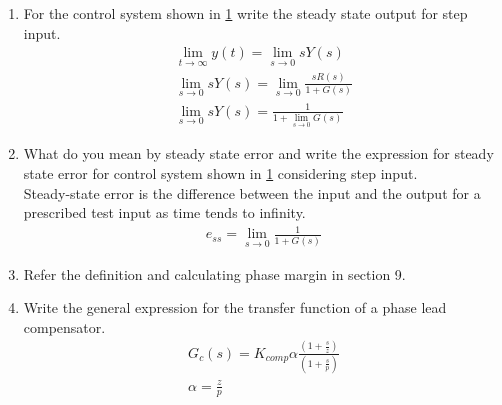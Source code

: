 \begin{enumerate}[label=\thesection.\arabic*.,ref=\thesection.\theenumi]



\item For the control system shown in \ref{fig:ee18btech11044_1} write the steady state output for step input. \\
\solution
\begin{align}
\lim_{t\to\infty} y(t)  = \lim_{s\to0} sY(s) \\
\lim_{s\to0} sY(s) = \lim_{s\to0}  \frac{s R(s)}{1+G(s)} \\
\lim_{s\to0} sY(s) = \frac{1}{1 + \lim_{s\to0}G(s)}
\end{align}
\begin{figure}[!ht]
	\begin{center}
		\resizebox{\columnwidth}{!}{}
	\end{center}
\caption{}
\label{fig:ee18btech11044_1}
\end{figure}

\item What do you mean by steady state error and write the expression for steady state error for control system shown in \ref{fig:ee18btech11044_1} considering step input. \\
\solution 
Steady-state error is the difference between the input and the output for a prescribed test input as time tends to infinity.
\begin{align}
    e_{ss} = \lim_{s\to0} \frac{1}{1 +G(s)}
\end{align}

\item Refer the definition and calculating phase margin in section 9. \\
\solution 

\item Write the general expression for the transfer function of a phase lead compensator. \\
\solution 
\begin{align}
    G_c(s) =  K_{comp}  \alpha  \frac{(1+\frac{s}{z})}{(1+ \frac{s}{p})} \\
    \alpha = \frac{z}{p}
\end{align}

\begin{figure}[!ht]
	\begin{center}
		\resizebox{\columnwidth}{!}{}
	\end{center}
\caption{}
\label{fig:ee18btech11044_2}
\end{figure}



\end{enumerate}
